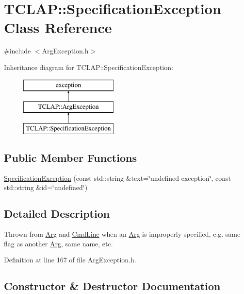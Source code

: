 \hypertarget{class_t_c_l_a_p_1_1_specification_exception}{}\section{T\+C\+L\+A\+P\+:\+:Specification\+Exception Class Reference}
\label{class_t_c_l_a_p_1_1_specification_exception}


{\ttfamily \#include $<$Arg\+Exception.\+h$>$}

Inheritance diagram for T\+C\+L\+A\+P\+:\+:Specification\+Exception\+:\begin{figure}[H]
\begin{center}
\leavevmode
\includegraphics[height=3.000000cm]{class_t_c_l_a_p_1_1_specification_exception}
\end{center}
\end{figure}
\subsection*{Public Member Functions}
\begin{DoxyCompactItemize}
\item 
\hyperlink{class_t_c_l_a_p_1_1_specification_exception_ad817016f03ebf4fc371e168636132abd}{Specification\+Exception} (const std\+::string \&text=\char`\"{}undefined exception\char`\"{}, const std\+::string \&id=\char`\"{}undefined\char`\"{})
\end{DoxyCompactItemize}


\subsection{Detailed Description}
Thrown from \hyperlink{class_t_c_l_a_p_1_1_arg}{Arg} and \hyperlink{class_t_c_l_a_p_1_1_cmd_line}{Cmd\+Line} when an \hyperlink{class_t_c_l_a_p_1_1_arg}{Arg} is improperly specified, e.\+g. same flag as another \hyperlink{class_t_c_l_a_p_1_1_arg}{Arg}, same name, etc. 

Definition at line 167 of file Arg\+Exception.\+h.



\subsection{Constructor \& Destructor Documentation}
\hypertarget{class_t_c_l_a_p_1_1_specification_exception_ad817016f03ebf4fc371e168636132abd}{}
